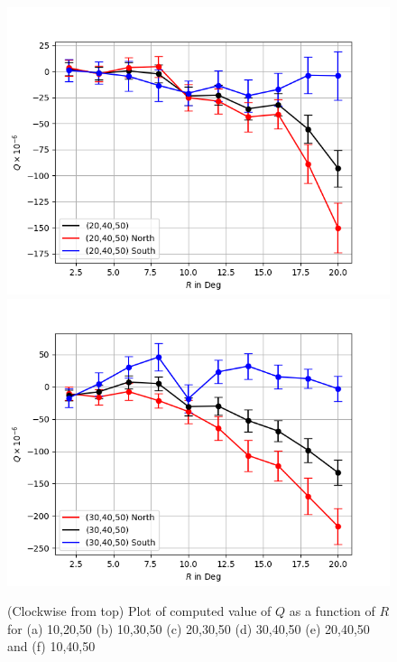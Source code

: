\documentclass[english]{article}
\begin{document}
\begin{figure}
	\includegraphics[scale=0.5]{Qhemisphere_wk_100_400_20_40_50_scrubbed.png}\includegraphics[scale=0.5]{Qhemisphere_wk_100_400_30_40_50_scrubbed.png}
	\caption{(Clockwise from top) Plot of computed value of $Q$ as a function
	of $R$ for (a) 10,20,50 (b) 10,30,50 (c) 20,30,50 (d) 30,40,50 (e) 20,40,50
	and (f) 10,40,50}
	\label{fig:hemisphere}
\end{figure}
\end{document}
